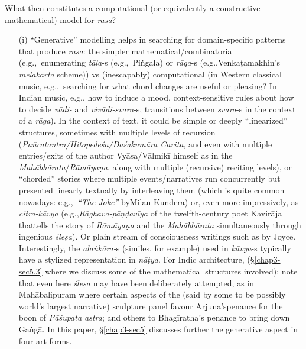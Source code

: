 What then constitutes a computational (or equivalently a constructive mathematical) model for \textsl{rasa}?
\begin{itemize}
\itemsep=0pt
\item[(i)] “Generative” modelling helps in searching for domain-specific patterns that produce \textsl{rasa}: the simpler mathematical/combi\-natorial (e.g.,~enumerating \textsl{tāla}-s (e.g.,~Piṅgala) or \textsl{rāga}-s (e.g.,\break Venkaṭamakhin's \textsl{melakarta} scheme)) vs (inescapably) computational (in Western classical music, e.g.,~searching for what chord changes are useful or pleasing? In Indian music, e.g., how to induce a mood, context-sensitive rules about how to decide \textsl{vādi-} and \textsl{vivādi-svara}-s, transitions between \hbox{\textsl{svara}-s} in the context of a \textsl{rāga}). In the context of text, it could be simple or deeply “linearized” structures, sometimes with multiple levels of recursion (\textsl{Pañcatantra/Hitopedeśa/Daśakumāra Carita}, and even with multiple entries/exits of the author Vyāsa/Vālmikī himself as in the \textsl{Mahābhārata}/\textsl{Rāmāyaṇa}, along with multiple (recursive) reciting levels), or “chorded” stories where multiple events/narratives run concurrently but presented linearly textually by interleaving them (which is quite common nowadays: e.g.,~\textsl{“The Joke”} by\break Milan Kundera) or, even more impressively, as \textsl{citra-kāvya} (e.g.,\break \textsl{Rāghava-pāṇḍavīya} of the twelfth-century poet Kavirāja that\break tells the story of \textsl{Rāmāyaṇa} and the \textsl{Mahābhārata} simultaneously through ingenious \textsl{śleṣa}). Or plain stream of consciousness writings such as by Joyce. Interestingly, the \textsl{alaṅkāra-}s (similes, for example) used in \hbox{\textsl{kāvya}-s} typically have a stylized representation in \textsl{nāṭya}. For Indic architecture, (\S\ref{chap3-sec5.3} where we discuss some of the mathematical structures involved); note that even here \textsl{śleṣa} may have been deliberately attempted, as in Mahābalipuram where certain aspects of the (said by some to be possibly world's largest narrative) sculpture panel favour Arjuna’s\break penance for the boon of \textsl{Pāśupata astra}; and others to Bhagīratha’s penance to bring down Gaṅgā. In this paper, \S\ref{chap3-sec5} discusses further the generative aspect in four art forms.


\end{itemize}
